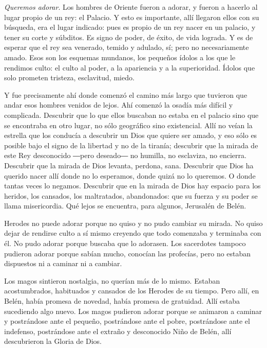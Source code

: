 \begin{body}
					\emph{Queremos adorar}. Los hombres de Oriente fueron a adorar, y fueron a hacerlo al lugar propio de un rey: el Palacio. Y esto es importante, allí llegaron ellos con su búsqueda, era el lugar indicado: pues es propio de un rey nacer en un palacio, y tener su corte y súbditos. Es signo de poder, de éxito, de vida lograda. Y es de esperar que el rey sea venerado, temido y adulado, sí; pero no necesariamente amado. Esos son los esquemas mundanos, los pequeños ídolos a los que le rendimos culto: el culto al poder, a la apariencia y a la superioridad. Ídolos que solo prometen tristeza, esclavitud, miedo.
					
					Y fue precisamente ahí donde comenzó el camino más largo que tuvieron que andar esos hombres venidos de lejos. Ahí comenzó la osadía más difícil y complicada. Descubrir que lo que ellos buscaban no estaba en el palacio sino que se encontraba en otro lugar, no sólo geográfico sino existencial. Allí no veían la estrella que los conducía a descubrir un Dios que quiere ser amado, y eso sólo es posible bajo el signo de la libertad y no de la tiranía; descubrir que la mirada de este Rey desconocido ―pero deseado― no humilla, no esclaviza, no encierra. Descubrir que la mirada de Dios levanta, perdona, sana. Descubrir que Dios ha querido nacer allí donde no lo esperamos, donde quizá no lo queremos. O donde tantas veces lo negamos. Descubrir que en la mirada de Dios hay espacio para los heridos, los cansados, los maltratados, abandonados: que su fuerza y su poder se llama misericordia. Qué lejos se encuentra, para algunos, Jerusalén de Belén.
					
					Herodes no puede adorar porque no quiso y no pudo cambiar su mirada. No quiso dejar de rendirse culto a sí mismo creyendo que todo comenzaba y terminaba con él. No pudo adorar porque buscaba que lo adorasen. Los sacerdotes tampoco pudieron adorar porque sabían mucho, conocían las profecías, pero no estaban dispuestos ni a caminar ni a cambiar.
					
					Los magos sintieron nostalgia, no querían más de lo mismo. Estaban acostumbrados, habituados y cansados de los Herodes de su tiempo. Pero allí, en Belén, había promesa de novedad, había promesa de gratuidad. Allí estaba sucediendo algo nuevo. Los magos pudieron adorar porque se animaron a caminar y postrándose ante el pequeño, postrándose ante el pobre, postrándose ante el indefenso, postrándose ante el extraño y desconocido Niño de Belén, allí descubrieron la Gloria de Dios.
				\end{body}
			
